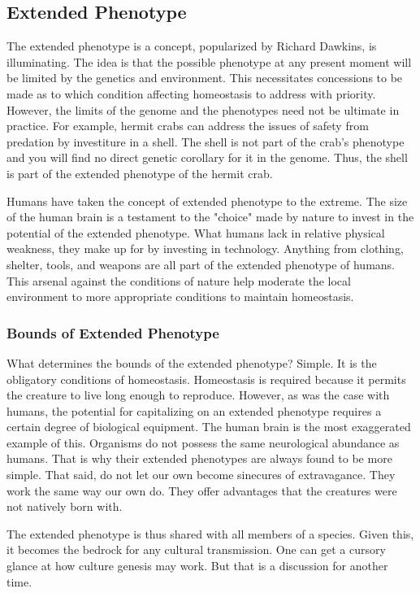 \documentclass[12pt]{article}
\begin{document}
\subsection{Extended Phenotype}
The extended phenotype is a concept, popularized by Richard Dawkins, is illuminating.
The idea is that the possible phenotype at any present moment will be limited by the genetics and environment.
This necessitates concessions to be made as to which condition affecting homeostasis to address with priority.
However, the limits of the genome and the phenotypes need not be ultimate in practice.
For example, hermit crabs can address the issues of safety from predation by investiture in a shell.
The shell is not part of the crab's phenotype and you will find no direct genetic corollary for it in the genome.
Thus, the shell is part of the extended phenotype of the hermit crab.

Humans have taken the concept of extended phenotype to the extreme.
The size of the human brain is a testament to the "choice" made by nature to invest in the potential of the extended phenotype.
What humans lack in relative physical weakness, they make up for by investing in technology.
Anything from clothing, shelter, tools, and weapons are all part of the extended phenotype of humans.
This arsenal against the conditions of nature help moderate the local environment to more appropriate conditions to maintain homeostasis.

\subsubsection{Bounds of Extended Phenotype}
What determines the bounds of the extended phenotype?
Simple.
It is the obligatory conditions of homeostasis.
Homeostasis is required because it permits the creature to live long enough to reproduce.
However, as was the case with humans, the potential for capitalizing on an extended phenotype requires a certain degree of biological equipment.
The human brain is the most exaggerated example of this.
Organisms do not possess the same neurological abundance as humans.
That is why their extended phenotypes are always found to be more simple.
That said, do not let our own become sinecures of extravagance.
They work the same way our own do.
They offer advantages that the creatures were not natively born with.

The extended phenotype is thus shared with all members of a species.
Given this, it becomes the bedrock for any cultural transmission.
One can get a cursory glance at how culture genesis may work.
But that is a discussion for another time.
\end{document}
